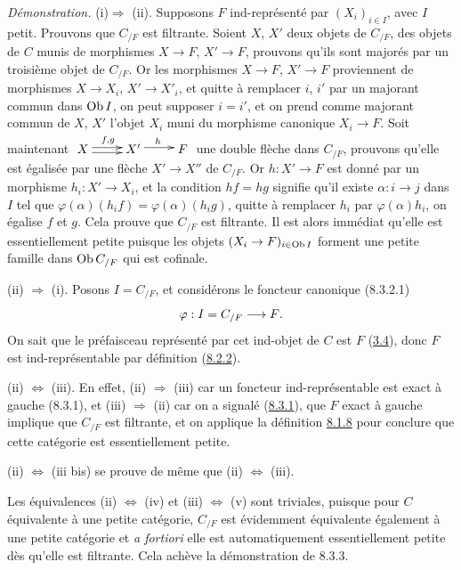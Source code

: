 \documentclass[10pt]{../fichiers-configuration-latex/smfart}
\begin{document}
\noindent \emph{Démonstration.} (i)\pageoriginale $\Rightarrow$
(ii). Supposons $F$ ind-représenté par $(X_i)_{i\in I}$, avec $I$
petit. Prouvons que $C_{/F}$ est filtrante. Soient $X$, $X'$ deux
objets de $C_{/F}$, \ie des objets de $C$ munis de morphismes
$X\rightarrow F$, $X'\rightarrow F$, prouvons qu'ils sont majorés
par un troisième objet de $C_{/F}$. Or les morphismes $X\rightarrow
F$, $X'\rightarrow F$ proviennent de morphismes $X\rightarrow X_i$,
$X'\rightarrow X'_i$, et quitte à remplacer $i$, $i'$ par un
majorant commun dans $\operatorname{Ob} I$, on peut supposer $i=i'$, et on prend
comme majorant commun de $X$, $X'$ l'objet $X_i$ muni du morphisme
canonique $X_i\rightarrow F$. Soit maintenant $\xymatrix{
X\ar@<2pt>[r]^{f,g}\ar@<-2pt>[r]& X' \ar@<2pt>[r]^{h} & F }$
 une double flèche dans $C_{/F}$, prouvons qu'elle est
égalisée par une flèche $X'\rightarrow X''$ de $C_{/F}$. Or
$h:X'\rightarrow F$ est donné par un morphisme $h_i:X'\rightarrow
X_i$, et la condition $hf=hg$ signifie qu'il existe
$\alpha:i\rightarrow j$ dans $I$ tel que
$\varphi(\alpha)(h_if)=\varphi(\alpha)(h_ig)$, \ie quitte à
remplacer $h_i$ par $\varphi(\alpha)h_i$, on égalise $f$ et $g$.
Cela prouve que $C_{/F}$ est filtrante. Il est alors immédiat
qu'elle est essentiellement petite puisque les objets
$(X_i\rightarrow F)_{i\in \operatorname{Ob} I}$ forment une petite famille dans
$\operatorname{Ob} C_{/F}$ qui est cofinale.

(ii) $\Rightarrow$ (i). Posons $I=C_{/F}$, et considérons le
foncteur canonique (8.3.2.1)
$$
\varphi:I=C_{/F}\longrightarrow F{}.
$$
On sait que le préfaisceau représenté par cet ind-objet de $C$ est
$F$ (\hyperref[I.prop3.4]{3.4}), donc $F$ est ind-représentable par
définition (\hyperref[I.sec8.2.2]{8.2.2}).

(ii) $\Leftrightarrow$ (iii). En effet, (ii) $\Rightarrow$ (iii) car
un foncteur ind-représentable est exact à gauche (8.3.1), et (iii)
$\Rightarrow$ (ii) car on a signalé (\hyperref[I.prop8.3.1]{8.3.1}), que $F$
exact à gauche implique que $C_{/F}$ est filtrante, et\pageoriginale
on applique la définition \hyperref[I.def8.1.8]{8.1.8} pour conclure que cette
catégorie est essentiellement petite.

(ii) $\Leftrightarrow$ (iii bis) se prouve de même que (ii)
$\Leftrightarrow$ (iii).

Les équivalences (ii) $\Leftrightarrow$ (iv) et (iii)
$\Leftrightarrow$ (v) sont triviales, puisque pour $C$ équivalente à
une petite catégorie, $C_{/F}$ est évidemment équivalente également
à une petite catégorie et \textit{a fortiori} elle est
automatiquement essentiellement petite dès qu'elle est filtrante.
Cela achève la démonstration de 8.3.3.
\end{document}

